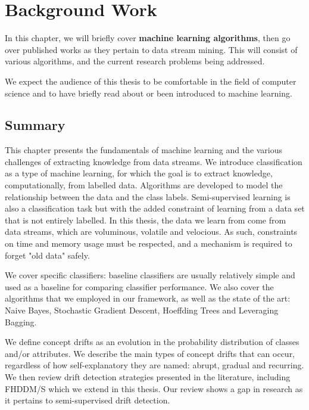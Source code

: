 
\chapter{Background Work} %

\label{chapter:background_work} %
In this chapter, we will briefly cover \textbf{machine learning algorithms}, then go over published works as they pertain to data stream mining. This will consist of various algorithms, and the current research problems being addressed.

We expect the audience of this thesis to be comfortable in the field of computer science and to have briefly read about or been introduced to machine learning.

\section{Summary}
This chapter presents the fundamentals of machine learning and the various challenges of extracting knowledge from data streams. We introduce classification as a type of machine learning, for which the goal is to extract knowledge, computationally, from labelled data. Algorithms are developed to model the relationship between the data and the class labels. Semi-supervised learning is also a classification task but with the added constraint of learning from a data set that is not entirely labelled. In this thesis, the data we learn from come from data streams, which are voluminous, volatile and velocious. As such, constraints on time and memory usage must be respected, and a mechanism is required to forget "old data" safely.

We cover specific classifiers: baseline classifiers are usually relatively simple and used as a baseline for comparing classifier performance. We also cover the algorithms that we employed in our framework, as well as the state of the art: Naive Bayes, Stochastic Gradient Descent, Hoeffding Trees and Leveraging Bagging.

We define concept drifts as an evolution in the probability distribution of classes and/or attributes. We describe the main types of concept drifts that can occur, regardless of how self-explanatory they are named: abrupt, gradual and recurring. We then review drift detection strategies presented in the literature, including FHDDM/S which we extend in this thesis. Our review shows a gap in research as it pertains to semi-supervised drift detection.

